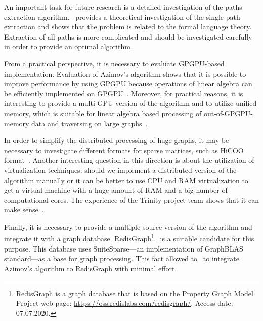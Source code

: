 An important task for future research is a detailed investigation of the paths extraction algorithm.~\cite{HellSinglePath} provides a theoretical investigation of the single-path extraction and shows that the problem is related to the formal language theory.
Extraction of all paths is more complicated and should be investigated carefully in order to provide an optimal algorithm.


From a practical perspective, it is necessary to evaluate GPGPU-based implementation.
Evaluation of Azimov's algorithm shows that it is possible to improve performance by using GPGPU because operations of linear algebra can be efficiently implemented on GPGPU~\cite{Mishin:2019:ECP:3327964.3328503,10.1145/3398682.3399163}.
Moreover, for practical reasons, it is interesting to provide a multi-GPU version of the algorithm and to utilize unified memory, which is suitable for linear algebra based processing of out-of-GPGPU-memory data and traversing on large graphs~\cite{8946118,10.14778/3384345.3384358}.

In order to simplify the distributed processing of huge graphs, it may be necessary to investigate different formats for sparse matrices, such as HiCOO format~\cite{10.5555/3291656.3291682}.
Another interesting question in this direction is about the utilization of virtualization techniques: should we implement a distributed version of the algorithm manually or it can be better to use CPU and RAM virtualization to get a virtual machine with a huge amount of RAM and a big number of computational cores.
The experience of the Trinity project team shows that it can make sense~\cite{10.1145/2463676.2467799}.

Finally, it is necessary to provide a multiple-source version of the algorithm and integrate it with a graph database.
RedisGraph\footnote{RedisGraph is a graph database that is based on the Property Graph
Model. Project web page: \url{https://oss.redislabs.com/redisgraph/}. Access date:
07.07.2020.}~\cite{8778293} is a suitable candidate for this purpose.
This database uses SuiteSparse---an implementation of GraphBLAS standard---as a base for graph processing.
This fact allowed to~\cite{10.1145/3398682.3399163} to integrate Azimov's algorithm to RedisGraph with minimal effort.
